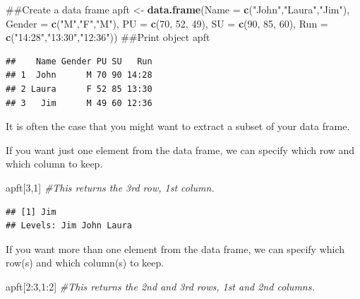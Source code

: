 \documentclass[]{book}
\newenvironment{Shaded}{\begin{snugshade}}{\end{snugshade}}
\newcommand{\KeywordTok}[1]{\textcolor[rgb]{0.13,0.29,0.53}{\textbf{{#1}}}}
\newcommand{\DataTypeTok}[1]{\textcolor[rgb]{0.13,0.29,0.53}{{#1}}}
\newcommand{\DecValTok}[1]{\textcolor[rgb]{0.00,0.00,0.81}{{#1}}}
\newcommand{\StringTok}[1]{\textcolor[rgb]{0.31,0.60,0.02}{{#1}}}
\newcommand{\CommentTok}[1]{\textcolor[rgb]{0.56,0.35,0.01}{\textit{{#1}}}}
\newcommand{\NormalTok}[1]{{#1}}
\begin{document}
\begin{Shaded}
\begin{Highlighting}[]
\NormalTok{##Create a data frame}
\NormalTok{apft <-}\StringTok{ }\KeywordTok{data.frame}\NormalTok{(}\DataTypeTok{Name =} \KeywordTok{c}\NormalTok{(}\StringTok{"John"}\NormalTok{,}\StringTok{"Laura"}\NormalTok{,}\StringTok{"Jim"}\NormalTok{),}
                   \DataTypeTok{Gender =} \KeywordTok{c}\NormalTok{(}\StringTok{"M"}\NormalTok{,}\StringTok{"F"}\NormalTok{,}\StringTok{"M"}\NormalTok{),}
                   \DataTypeTok{PU =} \KeywordTok{c}\NormalTok{(}\DecValTok{70}\NormalTok{, }\DecValTok{52}\NormalTok{, }\DecValTok{49}\NormalTok{),}
                   \DataTypeTok{SU =} \KeywordTok{c}\NormalTok{(}\DecValTok{90}\NormalTok{, }\DecValTok{85}\NormalTok{, }\DecValTok{60}\NormalTok{),}
                   \DataTypeTok{Run =} \KeywordTok{c}\NormalTok{(}\StringTok{"14:28"}\NormalTok{,}\StringTok{"13:30"}\NormalTok{,}\StringTok{"12:36"}\NormalTok{))}
\NormalTok{##Print object}
\NormalTok{apft}
\end{Highlighting}
\end{Shaded}

\begin{verbatim}
##    Name Gender PU SU   Run
## 1  John      M 70 90 14:28
## 2 Laura      F 52 85 13:30
## 3   Jim      M 49 60 12:36
\end{verbatim}

It is often the case that you might want to extract a subset of your
data frame.

If you want just one element from the data frame, we can specify which
row and which column to keep.

\begin{Shaded}
\begin{Highlighting}[]
\NormalTok{apft[}\DecValTok{3}\NormalTok{,}\DecValTok{1}\NormalTok{] }\CommentTok{#This returns the 3rd row, 1st column.}
\end{Highlighting}
\end{Shaded}

\begin{verbatim}
## [1] Jim
## Levels: Jim John Laura
\end{verbatim}

If you want more than one element from the data frame, we can specify
which row(s) and which column(s) to keep.

\begin{Shaded}
\begin{Highlighting}[]
\NormalTok{apft[}\DecValTok{2}\NormalTok{:}\DecValTok{3}\NormalTok{,}\DecValTok{1}\NormalTok{:}\DecValTok{2}\NormalTok{] }\CommentTok{#This returns the 2nd and 3rd rows, 1st and 2nd columns.}
\end{Highlighting}
\end{Shaded}
\end{document}
